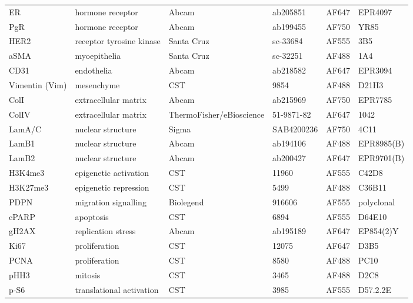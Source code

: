 \documentclass[preprint,review,3p,12pt]{elsarticle}
\begin{document}
\begin{supptable}[p]
{\begin{tabular}{l|l|l|l|l|l}
ER             & hormone receptor         & Abcam                    & ab205851     & AF647 & EPR4097      \\
PgR            & hormone receptor         & Abcam                    & ab199455     & AF750 & YR85         \\
HER2           & receptor tyrosine kinase & Santa Cruz               & sc-33684     & AF555 & 3B5          \\
aSMA           & myoepithelia             & Santa Cruz               & sc-32251     & AF488 & 1A4          \\
CD31           & endothelia               & Abcam                    & ab218582     & AF647 & EPR3094      \\
Vimentin (Vim) & mesenchyme               & CST                      & 9854         & AF488 & D21H3        \\
ColI           & extracellular matrix     & Abcam                    & ab215969     & AF750 & EPR7785      \\
ColIV          & extracellular matrix     & ThermoFisher/eBioscience & 51-9871-82   & AF647 & 1042         \\
LamA/C         & nuclear structure        & Sigma                    & SAB4200236   & AF750 & 4C11         \\
LamB1          & nuclear structure        & Abcam                    & ab194106     & AF488 & EPR8985(B)   \\
LamB2          & nuclear structure        & Abcam                    & ab200427     & AF647 & EPR9701(B)   \\
H3K4me3        & epigenetic activation    & CST                      & 11960        & AF555 & C42D8        \\
H3K27me3       & epigenetic repression    & CST                      & 5499         & AF488 & C36B11       \\
PDPN           & migration signalling     & Biolegend                & 916606       & AF555 & polyclonal   \\
cPARP          & apoptosis                & CST                      & 6894         & AF555 & D64E10       \\
gH2AX          & replication stress       & Abcam                    & ab195189     & AF647 & EP854(2)Y    \\
Ki67           & proliferation            & CST                      & 12075        & AF647 & D3B5         \\
PCNA           & proliferation            & CST                      & 8580         & AF488 & PC10         \\
pHH3           & mitosis                  & CST                      & 3465         & AF488 & D2C8         \\
p-S6           & translational activation & CST                      & 3985         & AF555 & D57.2.2E    
\end{tabular}}
\caption{}
\label{tab:marker_table}
\end{supptable}
\newpage
\end{document}
